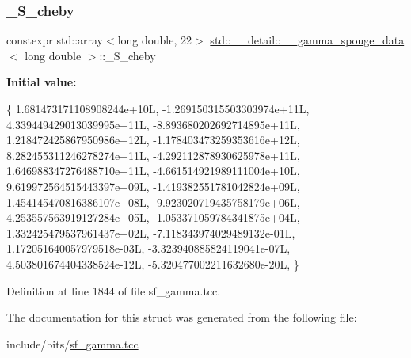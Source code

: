 \subsubsection{\texorpdfstring{\+\_\+\+S\+\_\+cheby}{\_S\_cheby}}
{\footnotesize\ttfamily constexpr std\+::array$<$long double, 22$>$ \hyperlink{structstd_1_1____detail_1_1____gamma__spouge__data}{std\+::\+\_\+\+\_\+detail\+::\+\_\+\+\_\+gamma\+\_\+spouge\+\_\+data}$<$ long double $>$\+::\+\_\+\+S\+\_\+cheby\hspace{0.3cm}{\ttfamily [static]}}

{\bfseries Initial value\+:}
\begin{DoxyCode}
\{
     1.681473171108908244e+10L,
    -1.269150315503303974e+11L,
     4.339449429013039995e+11L,
    -8.893680202692714895e+11L,
     1.218472425867950986e+12L,
    -1.178403473259353616e+12L,
     8.282455311246278274e+11L,
    -4.292112878930625978e+11L,
     1.646988347276488710e+11L,
    -4.661514921989111004e+10L,
     9.619972564515443397e+09L,
    -1.419382551781042824e+09L,
     1.454145470816386107e+08L,
    -9.923020719435758179e+06L,
     4.253557563919127284e+05L,
    -1.053371059784341875e+04L,
     1.332425479537961437e+02L,
    -7.118343974029489132e-01L,
     1.172051640057979518e-03L,
    -3.323940885824119041e-07L,
     4.503801674404338524e-12L,
    -5.320477002211632680e-20L,
      \}
\end{DoxyCode}


Definition at line 1844 of file sf\+\_\+gamma.\+tcc.



The documentation for this struct was generated from the following file\+:\begin{DoxyCompactItemize}
\item 
include/bits/\hyperlink{sf__gamma_8tcc}{sf\+\_\+gamma.\+tcc}\end{DoxyCompactItemize}

